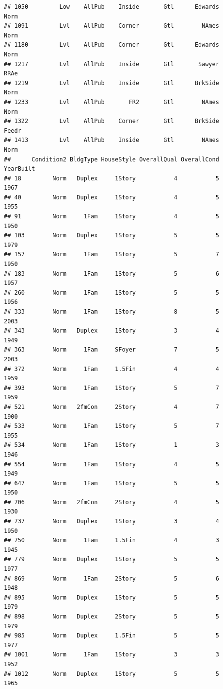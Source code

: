 \documentclass[]{article}
\begin{document}
\begin{verbatim}
## 1050         Low    AllPub    Inside       Gtl      Edwards       Norm
## 1091         Lvl    AllPub    Corner       Gtl        NAmes       Norm
## 1180         Lvl    AllPub    Corner       Gtl      Edwards       Norm
## 1217         Lvl    AllPub    Inside       Gtl       Sawyer       RRAe
## 1219         Lvl    AllPub    Inside       Gtl      BrkSide       Norm
## 1233         Lvl    AllPub       FR2       Gtl        NAmes       Norm
## 1322         Lvl    AllPub    Corner       Gtl      BrkSide      Feedr
## 1413         Lvl    AllPub    Inside       Gtl        NAmes       Norm
##      Condition2 BldgType HouseStyle OverallQual OverallCond YearBuilt
## 18         Norm   Duplex     1Story           4           5      1967
## 40         Norm   Duplex     1Story           4           5      1955
## 91         Norm     1Fam     1Story           4           5      1950
## 103        Norm   Duplex     1Story           5           5      1979
## 157        Norm     1Fam     1Story           5           7      1950
## 183        Norm     1Fam     1Story           5           6      1957
## 260        Norm     1Fam     1Story           5           5      1956
## 333        Norm     1Fam     1Story           8           5      2003
## 343        Norm   Duplex     1Story           3           4      1949
## 363        Norm     1Fam     SFoyer           7           5      2003
## 372        Norm     1Fam     1.5Fin           4           4      1959
## 393        Norm     1Fam     1Story           5           7      1959
## 521        Norm   2fmCon     2Story           4           7      1900
## 533        Norm     1Fam     1Story           5           7      1955
## 534        Norm     1Fam     1Story           1           3      1946
## 554        Norm     1Fam     1Story           4           5      1949
## 647        Norm     1Fam     1Story           5           5      1950
## 706        Norm   2fmCon     2Story           4           5      1930
## 737        Norm   Duplex     1Story           3           4      1950
## 750        Norm     1Fam     1.5Fin           4           3      1945
## 779        Norm   Duplex     1Story           5           5      1977
## 869        Norm     1Fam     2Story           5           6      1948
## 895        Norm   Duplex     1Story           5           5      1979
## 898        Norm   Duplex     2Story           5           5      1979
## 985        Norm   Duplex     1.5Fin           5           5      1977
## 1001       Norm     1Fam     1Story           3           3      1952
## 1012       Norm   Duplex     1Story           5           5      1965

\end{verbatim}
\end{document}
